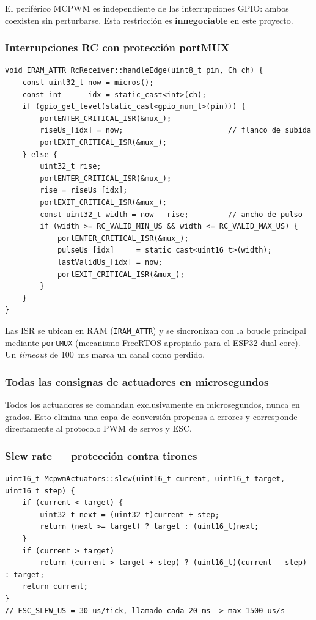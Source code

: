 \documentclass[12pt,a4paper]{article}
\begin{document}
El perif\'erico MCPWM es independiente de las interrupciones GPIO: ambos coexisten
sin perturbarse. Esta restricci\'on es \textbf{innegociable} en este proyecto.

\subsubsection{Interrupciones RC con protecci\'on portMUX}

\begin{lstlisting}[style=cpp, caption={RcReceiver.cpp -- ISR y seccion critica}]
void IRAM_ATTR RcReceiver::handleEdge(uint8_t pin, Ch ch) {
    const uint32_t now = micros();
    const int      idx = static_cast<int>(ch);
    if (gpio_get_level(static_cast<gpio_num_t>(pin))) {
        portENTER_CRITICAL_ISR(&mux_);
        riseUs_[idx] = now;                        // flanco de subida
        portEXIT_CRITICAL_ISR(&mux_);
    } else {
        uint32_t rise;
        portENTER_CRITICAL_ISR(&mux_);
        rise = riseUs_[idx];
        portEXIT_CRITICAL_ISR(&mux_);
        const uint32_t width = now - rise;         // ancho de pulso
        if (width >= RC_VALID_MIN_US && width <= RC_VALID_MAX_US) {
            portENTER_CRITICAL_ISR(&mux_);
            pulseUs_[idx]     = static_cast<uint16_t>(width);
            lastValidUs_[idx] = now;
            portEXIT_CRITICAL_ISR(&mux_);
        }
    }
}
\end{lstlisting}

Las ISR se ubican en RAM (\texttt{IRAM\_ATTR}) y se sincronizan con la
boucle principal mediante \texttt{portMUX} (mecanismo FreeRTOS apropiado para el
ESP32 dual-core). Un \emph{timeout} de 100~ms marca un canal como perdido.

\subsubsection{Todas las consignas de actuadores en microsegundos}

Todos los actuadores se comandan exclusivamente en microsegundos, nunca en grados.
Esto elimina una capa de conversi\'on propensa a errores y corresponde
directamente al protocolo PWM de servos y ESC.

\subsubsection{Slew rate --- protecci\'on contra tirones}

\begin{lstlisting}[style=cpp, caption={McpwmActuators.cpp -- limitacion de variacion}]
uint16_t McpwmActuators::slew(uint16_t current, uint16_t target, uint16_t step) {
    if (current < target) {
        uint32_t next = (uint32_t)current + step;
        return (next >= target) ? target : (uint16_t)next;
    }
    if (current > target)
        return (current > target + step) ? (uint16_t)(current - step) : target;
    return current;
}
// ESC_SLEW_US = 30 us/tick, llamado cada 20 ms -> max 1500 us/s
\end{lstlisting}
\end{document}

